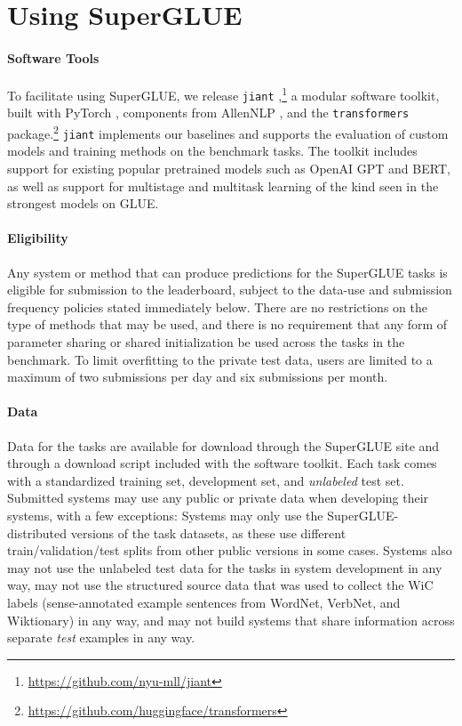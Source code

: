 \section{Using SuperGLUE}

\paragraph{Software Tools}
To facilitate using SuperGLUE, we release \texttt{jiant} \citep{wang2019jiant},\footnote{\url{https://github.com/nyu-mll/jiant}} a modular software toolkit, built with PyTorch \citep{paszke2017automatic}, components from AllenNLP \citep{Gardner2017AllenNLP}, and the \texttt{transformers} package.\footnote{\url{https://github.com/huggingface/transformers}}
\texttt{jiant} implements our baselines and supports the evaluation of custom models and training methods on the benchmark tasks.
The toolkit includes support for existing popular pretrained models such as OpenAI GPT and BERT, as well as support for multistage and multitask learning of the kind seen in the strongest models on GLUE.

\paragraph{Eligibility} Any system or method that can produce predictions for the SuperGLUE tasks is eligible for submission to the leaderboard, subject to the data-use and submission frequency policies stated immediately below. There are no restrictions on the type of methods that may be used, and there is no requirement that any form of parameter sharing or shared initialization be used across the tasks in the benchmark. 
To limit overfitting to the private test data, users are limited to a maximum of two submissions per day and six submissions per month.

\paragraph{Data} 
Data for the tasks are available for download through the SuperGLUE site and through a download script included with the software toolkit. 
Each task comes with a standardized training set, development set, and \textit{unlabeled} test set.
Submitted systems may use any public or private data when developing their systems, with a few exceptions: Systems may only use the SuperGLUE-distributed versions of the task datasets, as these use different train/validation/test splits from other public versions in some cases. Systems also may not use the unlabeled test data for the tasks in system development in any way, may not use the structured source data that was used to collect the WiC labels (sense-annotated example sentences from WordNet, VerbNet, and Wiktionary) in any way, and may not build systems that share information across separate \textit{test} examples in any way.

